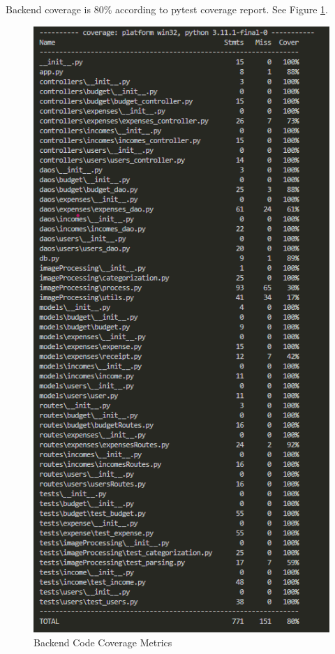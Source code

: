 \documentclass[12pt, titlepage]{article}
\begin{document}
Backend coverage is 80\% according to pytest coverage report. See Figure \ref{fig:coverage-backend}.
\begin{figure}[h!]
  \centering
  \includegraphics[width=\linewidth, height=0.85\textheight, keepaspectratio]{./coverage-backend.png}
  \caption{Backend Code Coverage Metrics}\label{fig:coverage-backend}
\end{figure}
\end{document}
